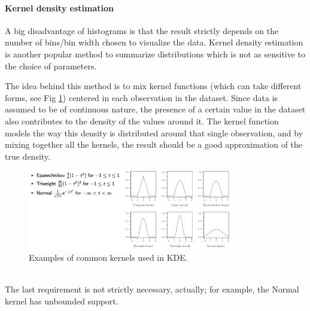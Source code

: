 \paragraph{Kernel density estimation}
A big disadvantage of histograms is that the result strictly depends on the number of bins/bin width chosen to visualize the data. Kernel density estimation is another popular method to summarize distributions which is not as sensitive to the choice of parameters.

The idea behind this method is to mix kernel functions (which can take different forms, see Fig \ref{fig:kernels}) centered in each observation in the dataset. Since data is assumed to be of continuous nature, the presence of a certain value in the dataset also contributes to the density of the values around it. The kernel function models the way this density is distributed around that single observation, and by mixing together all the kernels, the result should be a good approximation of the true density.
\begin{figure}[h]
    \centering
    \includegraphics[width=0.8\textwidth]{img/kernels.png}
    \caption{Examples of common kernels used in KDE.}
    \label{fig:kernels}
\end{figure} \\
The last requirement is not strictly necessary, actually; for example, the Normal kernel has unbounded support.

